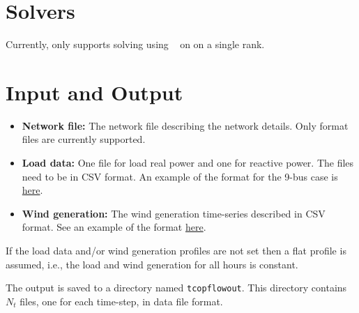 \section{Solvers}\label{sec:tcopflow_solvers}%
Currently, \exago only supports solving \tcopflow using \ipopt~ on on a single rank. %

\section{Input and Output}
\begin{itemize}
    \item \textbf{Network file:} The network file describing the network details. Only \matpower format files are currently supported.
    \item \textbf{Load data:} One file for load real power and one for reactive power. The files need to be in CSV format. An example of the format for the 9-bus case is \href{https://gitlab.pnnl.gov/exasgd/frameworks/exago/-/tree/master/datafiles/case9}{here}.
    \item \textbf{Wind generation:} The wind generation time-series described in CSV format. See an example of the format \href{https://gitlab.pnnl.gov/exasgd/frameworks/exago/-/tree/master/datafiles/case9}{here}.
\end{itemize}
If the load data and/or wind generation profiles are not set then a flat profile is assumed, i.e., the load and wind generation for all hours is constant.

The \tcopflow output is saved to a directory named \texttt{tcopflowout}. This directory contains $N_t$ files, one for each time-step, in \matpower data file format.

